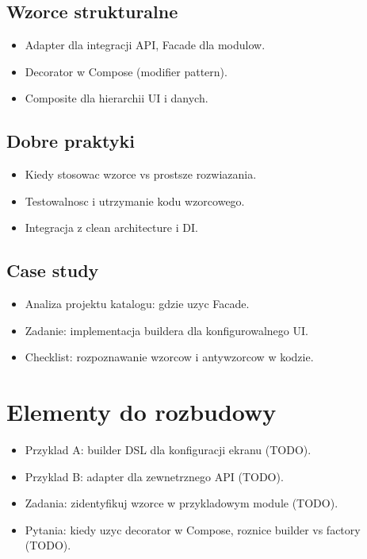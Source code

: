 \subsection{Wzorce strukturalne}
\begin{itemize}
  \item Adapter dla integracji API, Facade dla modulow.
  \item Decorator w Compose (modifier pattern).
  \item Composite dla hierarchii UI i danych.
\end{itemize}

\subsection{Dobre praktyki}
\begin{itemize}
  \item Kiedy stosowac wzorce vs prostsze rozwiazania.
  \item Testowalnosc i utrzymanie kodu wzorcowego.
  \item Integracja z clean architecture i DI.
\end{itemize}

\subsection{Case study}
\begin{itemize}
  \item Analiza projektu katalogu: gdzie uzyc Facade.
  \item Zadanie: implementacja buildera dla konfigurowalnego UI.
  \item Checklist: rozpoznawanie wzorcow i antywzorcow w kodzie.
\end{itemize}

\section{Elementy do rozbudowy}
\begin{itemize}
  \item Przyklad A: builder DSL dla konfiguracji ekranu (TODO).
  \item Przyklad B: adapter dla zewnetrznego API (TODO).
  \item Zadania: zidentyfikuj wzorce w przykladowym module (TODO).
  \item Pytania: kiedy uzyc decorator w Compose, roznice builder vs factory (TODO).
\end{itemize}


